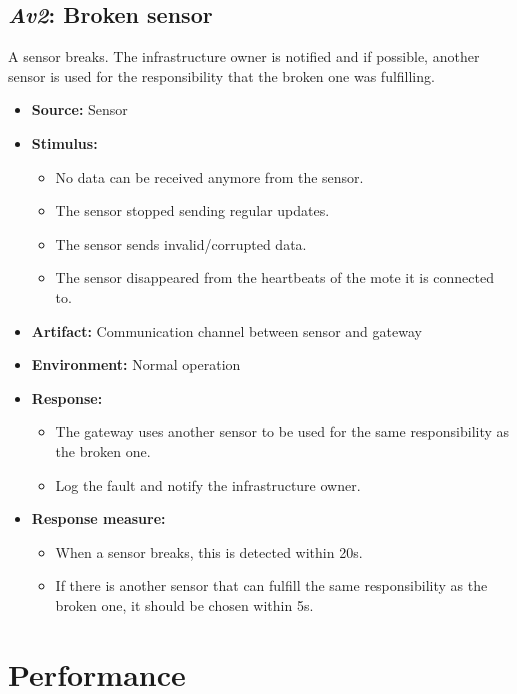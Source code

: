 \subsection{\emph{Av2}: Broken sensor}
A sensor breaks. The infrastructure owner is notified and if possible, another
sensor is used for the responsibility that the broken one was fulfilling.

\begin{itemize}
    \item \textbf{Source:} Sensor
    \item \textbf{Stimulus:}
        \begin{itemize}
            \item No data can be received anymore from the sensor.
            \item The sensor stopped sending regular updates.
            \item The sensor sends invalid/corrupted data.
            \item The sensor disappeared from the heartbeats of the mote it
                  is connected to.
        \end{itemize}

    \item \textbf{Artifact:} Communication channel between sensor and gateway
    \item \textbf{Environment:} Normal operation
    \item \textbf{Response:}
        \begin{itemize}
            \item The gateway uses another sensor to be used for
                  the same responsibility as the broken one.
            \item Log the fault and notify the infrastructure owner.
        \end{itemize}

    \item \textbf{Response measure:}
        \begin{itemize}
            \item When a sensor breaks, this is detected within 20s.
            \item If there is another sensor that can fulfill the same responsibility
                  as the broken one, it should be chosen within 5s.
        \end{itemize}
\end{itemize}

\section{Performance}
